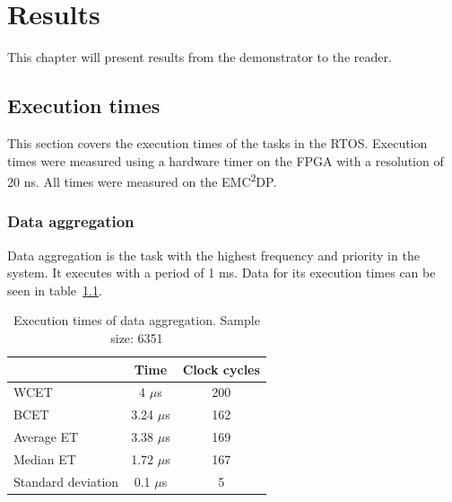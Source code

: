 \chapter{Results}
\label{sec:results}

This chapter will present results from the demonstrator to the reader.\\



\section{Execution times}
This section covers the execution times of the tasks in the RTOS. Execution times were measured using a hardware timer on the FPGA with a resolution of 20 ns. All times were measured on the EMC\textsuperscript{2}DP. %

\subsection{Data aggregation}
Data aggregation is the task with the highest frequency and priority in the system. It executes with a period of 1 ms. Data for its execution times can be seen in table~\ref{table:data_aggregation}.

\begin{table}[H]
\centering
\begin{tabular}{|l|c|c|}
\hline
 & Time & Clock cycles \\ \hline
WCET & 4 $\mu$s & 200 \\ \hline
BCET & 3.24 $\mu$s & 162 \\ \hline
Average ET & 3.38 $\mu$s & 169 \\ \hline
Median ET & 1.72 $\mu$s & 167 \\ \hline
Standard deviation & 0.1 $\mu$s & 5 \\ \hline
\end{tabular}
\caption{Execution times of data aggregation. Sample size: 6351}
\label{table:data_aggregation}
\end{table}

